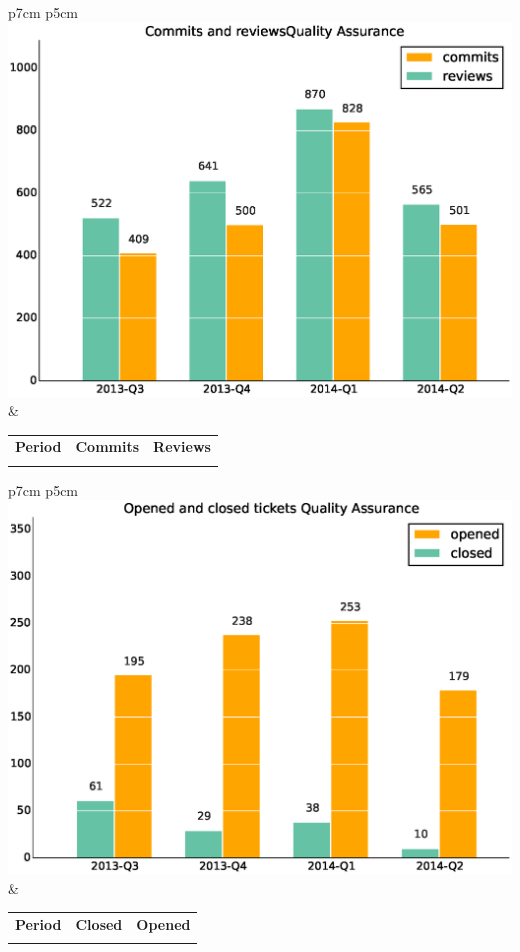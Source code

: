 \documentclass[a4wide,11pt]{report}
\begin{document}
\begin{tabular}{p{7cm} p{5cm}}
    \vspace{0pt} 
    \includegraphics[scale=.35]{figs/commitsQualityAssurance.eps}
    & 
    \vspace{0pt}
    \begin{tabular}{l|r|r|}%
    \bfseries Period & \bfseries Commits & \bfseries Reviews %
    \csvreader[head to column names]{data/commitsQualityAssurance.csv}{}%
    {\\ & \commits & \submitted}
    \end{tabular}
\end{tabular}

\begin{tabular}{p{7cm} p{5cm}}
    \vspace{0pt} 
    \includegraphics[scale=.35]{figs/closedQualityAssurance.eps}
    & 
    \vspace{0pt}
    \begin{tabular}{l|r|r|}%
\bfseries Period & \bfseries Closed & \bfseries Opened
    \csvreader[head to column names]{data/closedQualityAssurance.csv}{}%
    {\\ & \closed & \opened}
    \end{tabular}
\end{tabular}
\end{document}
